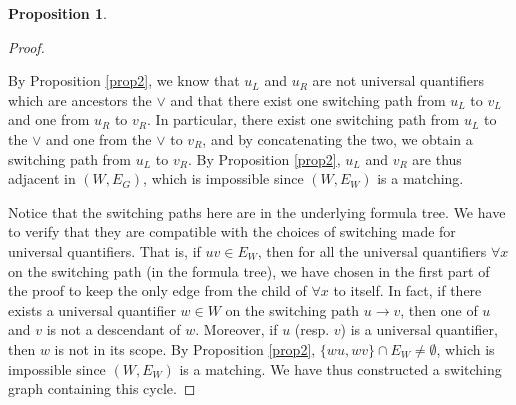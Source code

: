 \documentclass[conference,twosided,10pt]{IEEEtran}
\theoremstyle{definition}
\newtheorem{proposition}[thm]{Proposition}
\begin{document}
\begin{proposition}
\begin{proof}
\begin{itemize}
    By Proposition \ref{prop2}, we know that $u_L$ and $u_R$ are not
	universal quantifiers which are ancestors the $\vee$
	and that there exist one switching path from $u_L$ to $v_L$ and one
	from $u_R$ to $v_R$. In particular, there exist one switching path from
	$u_L$ to the $\vee$ and one from the $\vee$ to $v_R$, and by
	concatenating the two, we obtain a switching path from $u_L$ to $v_R$. 
	By Proposition \ref{prop2}, $u_L$ and $v_R$ are thus adjacent in $(W,
	E_G)$, which is impossible since $(W, E_W)$ is a matching.
  \end{itemize}
  Notice that the switching paths here are in the underlying formula tree. We
  have to verify that they are compatible with the choices of switching made for
  universal quantifiers. That is, if $uv \in E_W$, then for all the
  universal quantifiers $\forall x$ on the switching path (in the formula
	tree), we have chosen in the first part of the proof to keep the only
	edge from the child of $\forall x$ to itself. In fact, if there exists
	a universal quantifier $w \in W$ on the switching path $u \rightarrow
	v$, then one of $u$ and $v$ is not a descendant of $w$. Moreover, if
	$u$ (resp. $v$) is a universal quantifier, then $w$ is not in its scope.
	By Proposition \ref{prop2}, $\{wu, wv\} \cap E_W \neq \emptyset$, which
	is impossible since $(W, E_W)$ is a matching.
  We have thus constructed a switching graph containing this cycle.
\end{proof}
\end{proposition}
\end{document}
